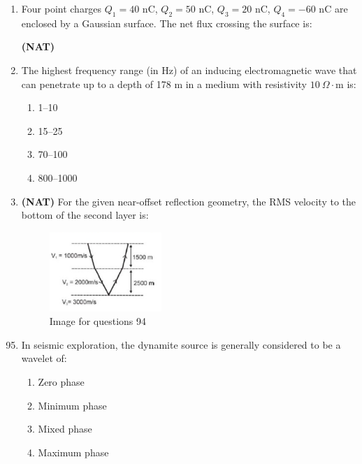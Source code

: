 \documentclass[journal,12pt,onecolumn]{IEEEtran}
\theoremstyle{remark}
\begin{document}
\begin{enumerate}
\item Four point charges $Q_1 = 40$ nC, $Q_2 = 50$ nC, $Q_3 = 20$ nC, $Q_4 = -60$ nC are enclosed by a Gaussian surface. The net flux crossing the surface is:

\textbf{(NAT)} \underline{\hspace{2cm}}

\vspace{0.5cm}

\item The highest frequency range (in Hz) of an inducing electromagnetic wave that can penetrate up to a depth of 178 m in a medium with resistivity $10\ \Omega\cdot$m is:

\begin{multicols}{4}
\begin{enumerate}
\item 1--10  
\item 15--25  
\item 70--100  
\item 800--1000  
\end{enumerate}
\end{multicols}

\item \textbf{(NAT)} For the given near-offset reflection geometry, the RMS velocity to the bottom of the second layer is:

\begin{figure}[H]
    \centering
    \includegraphics[width=0.4\textwidth]{figs/fig16.png}
    \caption{Image for questions 94}
    \label{fig:question94}
\end{figure}


\underline{\hspace{2cm}}

\end{enumerate}
\begin{enumerate}
\setcounter{enumi}{94}


\vspace{0.5cm}
\item In seismic exploration, the dynamite source is generally considered to be a wavelet of:

\begin{multicols}{2}
\begin{enumerate}
\item Zero phase  
\item Minimum phase  
\item Mixed phase  
\item Maximum phase  
\end{enumerate}
\end{multicols}
\end{enumerate}
\end{document}
